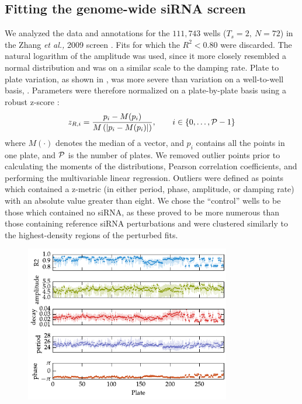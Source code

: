\subsection{Fitting the genome-wide siRNA screen}
We analyzed the data and annotations for the $111,743$ wells ($T_s = 2,\ N = 72$) in the Zhang {\itshape et al.,} 2009 screen \cite{Zhang2009}.
Fits for which the $R^2 < 0.80$ were discarded.
The natural logarithm of the amplitude was used, since it more closely resembled a normal distribution and was on a similar scale to the damping rate.
Plate to plate variation, as shown in , was more severe than variation on a well-to-well basis, .
Parameters were therefore normalized on a plate-by-plate basis using a robust z-score \cite{Birmingham2009}:
\[
  z_{R,i} = \frac{p_i - M(p_i)}{M\left(\left|p_i - M(p_i)\right|\right)}, \qquad i \in \{0, \dots, {\cal P} - 1 \}
\]
where $M(\cdot)$ denotes the median of a vector, and $p_i$ contains all the points in one plate, and $\cal P$ is the number of plates.
We removed outlier points prior to calculating the moments of the distributions, Pearson correlation coefficients, and performing the multivariable linear regression.
Outliers were defined as points which contained a z-metric (in either period, phase, amplitude, or damping rate) with an absolute value greater than eight.
We chose the ``control'' wells to be those which contained no siRNA, as these proved to be more numerous than those containing reference siRNA perturbations and were clustered similarly to the highest-density regions of the perturbed fits.

\begin{figure}[tbp]
  \begin{center}
    \includegraphics[width=0.8\textwidth]{chap6/figures/zhang_plates.pdf}
  \end{center}
\label{fig:plate_variation}
\end{figure}

